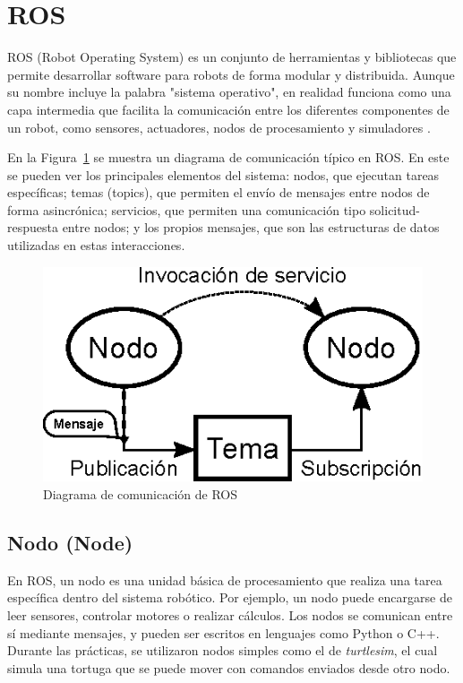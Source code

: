 \section{ROS} \label{sec:ros}
ROS (Robot Operating System) es un conjunto de herramientas y bibliotecas que permite desarrollar software para robots de forma modular y distribuida. Aunque su nombre incluye la palabra "sistema operativo", en realidad funciona como una capa intermedia que facilita la comunicación entre los diferentes componentes de un robot, como sensores, actuadores, nodos de procesamiento y simuladores \cite{ros2-understanding-topics}.

En la Figura~\ref{fig:rosconcepts} se muestra un diagrama de comunicación típico en ROS. En este se pueden ver los principales elementos del sistema: nodos, que ejecutan tareas específicas; temas (topics), que permiten el envío de mensajes entre nodos de forma asincrónica; servicios, que permiten una comunicación tipo solicitud-respuesta entre nodos; y los propios mensajes, que son las estructuras de datos utilizadas en estas interacciones.

\begin{figure}[h]
	\centering
	\includegraphics[width=0.5\linewidth]{img/ROS_concepts}
	\caption{Diagrama de comunicación de ROS}
	\label{fig:rosconcepts}
\end{figure}

\pagebreak[4]  

\subsection{Nodo (Node)}
En ROS, un nodo es una unidad básica de procesamiento que realiza una tarea específica dentro del sistema robótico. Por ejemplo, un nodo puede encargarse de leer sensores, controlar motores o realizar cálculos. Los nodos se comunican entre sí mediante mensajes, y pueden ser escritos en lenguajes como Python o C++. Durante las prácticas, se utilizaron nodos simples como el de \textit{turtlesim}, el cual simula una tortuga que se puede mover con comandos enviados desde otro nodo.

